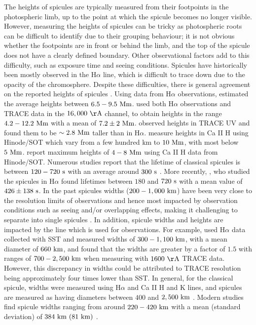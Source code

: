 \documentclass[12pt]{ociamthesis}
\newcommand{\np}{\\ \\}
\begin{document}
%
The heights of spicules are typically measured from their footpoints in the photospheric limb, up to the point at which the spicule becomes no longer visible. However, measuring the heights of spicules can be tricky as photospheric roots can be difficult to identify due to their grouping behaviour; it is not obvious whether the footpoints are in front or behind the limb, and the top of the spicule does not have a clearly defined boundary. Other observational factors add to this difficulty, such as exposure time and seeing conditions. Spicules have historically been mostly observed in the H$\alpha$ line, which is difficult to trace down due to the opacity of the chromosphere. Despite these difficulties, there is general agreement on the reported heights of spicules \citep{Tsiropoula2012}. Using data from H$\alpha$ observations, \cite{Beckers1972ARA&A,Beckers1968} estimated the average heights between $6.5-9.5~\rm{Mm}$. \cite{Pasachoff2009SoPh26059P} used both H$\alpha$ observations and TRACE data in the $16,000~\rm{ \AA}$ channel, to obtain heights in the range $4.2-12.2~\rm{Mm}$ with a mean of $7.2\pm2~\rm{Mm}$. \cite{Pasachoff2009SoPh26059P} observed heights in TRACE UV and found them to be $\sim 2.8~\rm{Mm}$ taller than in H$\alpha$. \cite{Pontieu2007PASJ} measure heights in Ca II H using Hinode/SOT which vary from a few hundred km to $10~\rm{Mm}$, with most below $5~\rm{Mm}$. \cite{Pereira2012} report maximum heights of $4-8~\rm{Mm}$ using Ca II H data from Hinode/SOT. Numerous studies report that the lifetime of classical spicules is between $120-720~\rm{s}$ with an average around $300~\rm{s}$ \citep{Roberts1945ApJ,Rush1954AuJPh7230R, Lippincott1957SCoA215L, Alissandrakis1971SoPh2047A, Cook1984AdSpR459C, Georgakilas1999AA341610G}. More recently, \cite{Pasachoff2009SoPh26059P}, who studied the spicules in H$\alpha$ found lifetimes between $180$ and $720~\rm{s}$ with a mean value of $426\pm138~\rm{s}$.
% 
In the past spicules widths ($200-1,000~\rm{km}$) have been very close to the resolution limits of observations and hence most impacted by observation conditions such as seeing and/or overlapping effects, making it challenging to separate into single spicules \citep{Pontieu2007ASPC, Tsiropoula2012}. In addition, spicule widths and heights are impacted by the line which is used for observations. For example, \cite{Pasachoff2009SoPh26059P} used H$\alpha$ data collected with SST and measured widths of $300-1,100~\rm{km}$, with a mean diameter of $660~\rm{km}$, and found that the widths are greater by a factor of $1.5$ with ranges of $700-2,500~\rm{km}$ when measuring with $1600~\rm{\AA}$ TRACE data. However, this discrepancy in widths could be attributed to TRACE resolution being approximately four times lower than SST. In general, for the classical spicule, widths were measured using H$\alpha$ and Ca II H and K lines, and spicules are measured as having diameters between $400$ and $2,500~\rm{km}$ \citep{Beckers1968, Dunn1960Obs8031D, Beckers1972ARA&A, Lynch1973SoPh3063L}. Modern studies find spicule widths ranging from around $220-420~\rm{km}$ with a mean (standard deviation) of $384~\rm{km}~(81~\rm{km})$ \cite{Pereira2012}. \np
\end{document}
